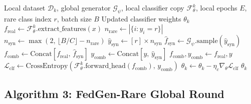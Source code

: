 \documentclass[12pt,a4paper]{report}
\begin{document}
\begin{algorithm}[H]
\caption{Local Classifier Training via Generative Replay (Hospital $k$)}
\label{alg:clf_replay}
\begin{algorithmic}[1]
\Require Local dataset $\mathcal{D}_k$, global generator $\mathcal{G}_\psi$, local classifier copy $\mathcal{F}_\theta^k$, local epochs $E$, rare class index $r$, batch size $B$
\Ensure Updated classifier weights $\theta_k$
        \State $f_{\text{real}} \leftarrow \mathcal{F}_\theta^k.\text{extract\_features}(x)$
        \State $n_{\text{rare}} \leftarrow |\{i : y_i = r\}|$
        \State $n_{\text{syn}} \leftarrow \max\!\left(2,\, \lfloor B/C \rfloor - n_{\text{rare}}\right)$
            \State $\hat{y}_{\text{syn}} \leftarrow [r] \times n_{\text{syn}}$
            \State $\hat{f}_{\text{syn}} \leftarrow \mathcal{G}_\psi.\text{sample}(\hat{y}_{\text{syn}})$
            \State $f_{\text{comb}} \leftarrow \text{Concat}[f_{\text{real}},\, \hat{f}_{\text{syn}}]$
            \State $y_{\text{comb}} \leftarrow \text{Concat}[y,\, \hat{y}_{\text{syn}}]$
        \Else
            \State $f_{\text{comb}}, y_{\text{comb}} \leftarrow f_{\text{real}}, y$
        \EndIf
        \State $\mathcal{L}_{\text{clf}} \leftarrow \text{CrossEntropy}(\mathcal{F}_\theta^k.\text{forward\_head}(f_{\text{comb}}),\, y_{\text{comb}})$
        \State $\theta_k \leftarrow \theta_k - \eta_c \nabla_\theta \mathcal{L}_{\text{clf}}$
    \EndFor
\EndFor
\State \Return $\theta_k$
\end{algorithmic}
\end{algorithm}

\subsection{Algorithm 3: FedGen-Rare Global Round}
\end{document}
